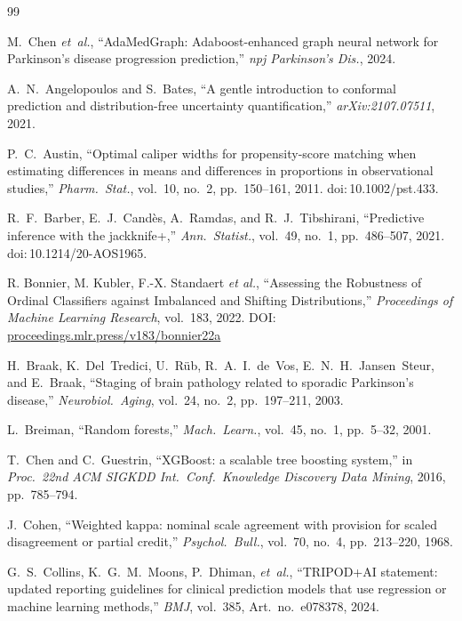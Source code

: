 \documentclass[10pt,letterpaper]{article}
\begin{document}
\nolinenumbers

\begin{thebibliography}{99}

M.~Chen \textit{et~al.}, ``AdaMedGraph: Adaboost-enhanced graph neural network for Parkinson's disease progression prediction,'' \textit{npj Parkinson's Dis.}, 2024.

A.~N.~Angelopoulos and S.~Bates, ``A gentle introduction to conformal prediction and distribution-free uncertainty quantification,'' \textit{arXiv:2107.07511}, 2021.

P.~C.~Austin, ``Optimal caliper widths for propensity-score matching when estimating differences in means and differences in proportions in observational studies,'' \textit{Pharm.\ Stat.}, vol.~10, no.~2, pp.~150--161, 2011. doi:\,10.1002/pst.433.

R.~F.~Barber, E.~J.~Cand\`{e}s, A.~Ramdas, and R.~J.~Tibshirani, ``Predictive inference with the jackknife+,'' \textit{Ann.\ Statist.}, vol.~49, no.~1, pp.~486--507, 2021. doi:\,10.1214/20-AOS1965.

R. Bonnier, M. Kubler, F.-X. Standaert \textit{et al.},
``Assessing the Robustness of Ordinal Classifiers against Imbalanced and Shifting Distributions,''
\textit{Proceedings of Machine Learning Research}, vol.~183, 2022. DOI: \href{https://proceedings.mlr.press/v183/bonnier22a.html}{proceedings.mlr.press/v183/bonnier22a}

H.~Braak, K.~Del~Tredici, U.~R\"{u}b, R.~A.~I.~de~Vos, E.~N.~H.~Jansen~Steur, and E.~Braak, ``Staging of brain pathology related to sporadic Parkinson's disease,'' \textit{Neurobiol.\ Aging}, vol.~24, no.~2, pp.~197--211, 2003.

L.~Breiman, ``Random forests,'' \textit{Mach.\ Learn.}, vol.~45, no.~1, pp.~5--32, 2001.

T.~Chen and C.~Guestrin, ``XGBoost: a scalable tree boosting system,'' in \textit{Proc.\ 22nd ACM SIGKDD Int.\ Conf.\ Knowledge Discovery Data Mining}, 2016, pp.~785--794.

J.~Cohen, ``Weighted kappa: nominal scale agreement with provision for scaled disagreement or partial credit,'' \textit{Psychol.\ Bull.}, vol.~70, no.~4, pp.~213--220, 1968.

G.~S.~Collins, K.~G.~M.~Moons, P.~Dhiman, \textit{et~al.}, ``TRIPOD+AI statement: updated reporting guidelines for clinical prediction models that use regression or machine learning methods,'' \textit{BMJ}, vol.~385, Art.\ no.~e078378, 2024.


\end{thebibliography}
\end{document}
